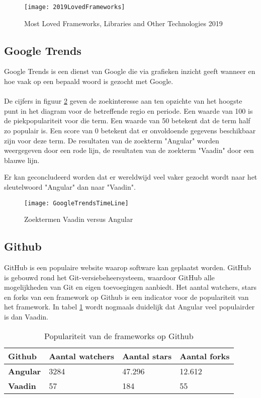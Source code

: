\begin{figure}[H]
	\centering
	\texttt{[image: 2019LovedFrameworks]}
	\caption{Most Loved Frameworks, Libraries and Other Technologies 2019 \autocite{DeveloperSurvey2019}}
	\label{fig:Most Loved Frameworks, Libraries and Other Technologies 2019}
\end{figure}

\subsection{Google Trends}

Google Trends is een dienst van Google die via grafieken inzicht geeft wanneer en hoe vaak op een bepaald woord is gezocht met Google. \\ \\
De cijfers in figuur \ref{fig:Google Trends zoektermen} geven de zoekinteresse aan ten opzichte van het hoogste punt in het diagram voor de betreffende regio en periode. Een waarde van 100 is de piekpopulariteit voor die term. Een waarde van 50 betekent dat de term half zo populair is. Een score van 0 betekent dat er onvoldoende gegevens beschikbaar zijn voor deze term. De resultaten van de zoekterm "Angular" worden weergegeven door een rode lijn, de resultaten van de zoekterm "Vaadin" door een blauwe lijn.

Er kan geconcludeerd worden dat er wereldwijd veel vaker gezocht wordt naar het sleutelwoord "Angular" dan naar "Vaadin". 

\begin{figure}[H]
	\centering
	\texttt{[image: GoogleTrendsTimeLine]}
	\caption{Zoektermen Vaadin versus Angular \autocite{GoogleTrends2019}}
	\label{fig:Google Trends zoektermen}
\end{figure}

\subsection{Github}
GitHub is een populaire website waarop software kan geplaatst worden. GitHub is gebouwd rond het Git-versiebeheersysteem, waardoor GitHub alle mogelijkheden van Git en eigen toevoegingen aanbiedt. Het aantal watchers, stars en forks van een framework op Github is een indicator voor de populariteit van het framework. In tabel \ref{table:github} wordt nogmaals duidelijk dat Angular veel populairder is dan Vaadin.

\begin{table}[H]
	\begin{tabular}{|l|l|l|l|}
		\hline
		\textbf{Github}  & \textbf{Aantal watchers} & \textbf{Aantal stars} & \textbf{Aantal forks} \\ \hline
		\textbf{Angular} & 3284                     & 47.296                & 12.612                \\ \hline
		\textbf{Vaadin}  & 57                       & 184                   & 55                    \\ \hline
	\end{tabular}
	\caption{Populariteit van de frameworks op Github}
\label{table:github}
\end{table}

